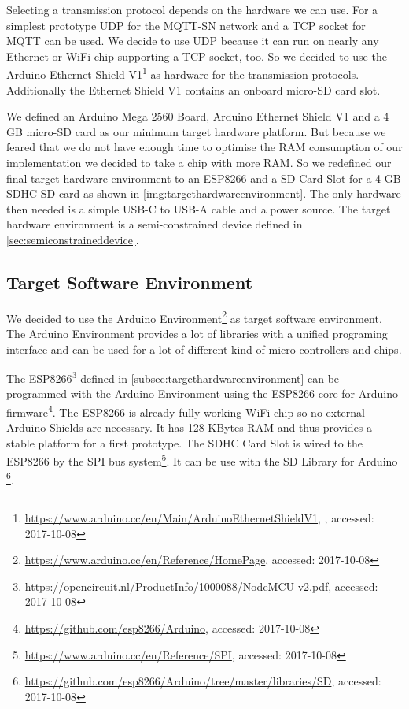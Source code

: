 Selecting a transmission protocol depends on the hardware we can use.
For a simplest prototype UDP for the MQTT-SN network and a TCP socket for MQTT can be used.
We decide to use UDP because it can run on nearly any Ethernet or WiFi chip supporting a TCP socket, too.
So we decided to use the Arduino Ethernet Shield V1\footnote{\url{https://www.arduino.cc/en/Main/ArduinoEthernetShieldV1}, , accessed: 2017-10-08} as hardware for the transmission protocols.
Additionally the Ethernet Shield V1 contains an onboard micro-SD card slot.

We defined an Arduino Mega 2560 Board, Arduino Ethernet Shield V1 and a 4 GB micro-SD card as our minimum target hardware platform.
But because we feared that we do not have enough time to optimise the RAM consumption of our implementation we decided to take a chip with more RAM.
So we redefined our final target hardware environment to an ESP8266 and a SD Card Slot for a 4 GB SDHC SD card as shown in \autoref{img:targethardwareenvironment}.
The only hardware then needed is a simple USB-C to USB-A cable and a power source.
The target hardware environment is a semi-constrained device defined in \autoref{sec:semiconstraineddevice}.

\subsection{Target Software Environment}\label{subsec:targetsoftwareenvironment}
We decided to use the Arduino Environment\footnote{\url{https://www.arduino.cc/en/Reference/HomePage}, accessed: 2017-10-08} as target software environment.
The Arduino Environment provides a lot of libraries with a unified programing interface and can be used for a lot of different kind of micro controllers and chips.

The ESP8266\footnote{\url{https://opencircuit.nl/ProductInfo/1000088/NodeMCU-v2.pdf}, accessed: 2017-10-08} defined in \autoref{subsec:targethardwareenvironment} can be programmed with the Arduino Environment using the ESP8266 core for Arduino firmware\footnote{\url{https://github.com/esp8266/Arduino}, accessed: 2017-10-08}.
The ESP8266 is already fully working WiFi chip so no external Arduino Shields are necessary.
It has 128 KBytes RAM and thus provides a stable platform for a first prototype.
The SDHC Card Slot is wired to the ESP8266 by the SPI bus system\footnote{\url{https://www.arduino.cc/en/Reference/SPI}, accessed: 2017-10-08}.
It can be use with the SD Library for Arduino \footnote{\url{https://github.com/esp8266/Arduino/tree/master/libraries/SD}, accessed: 2017-10-08}.

